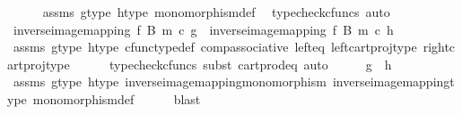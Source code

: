 \begin{isabellebody}
\ \ \ \ \isamarkupfalse%
\ assms\ g{\isacharunderscore}{\kern0pt}type\ h{\isacharunderscore}{\kern0pt}type\ monomorphism{\isacharunderscore}{\kern0pt}def{}\ \isamarkupfalse%
\ {\isacharparenleft}{\kern0pt}typecheck{\isacharunderscore}{\kern0pt}cfuncs{\isacharcomma}{\kern0pt}\ auto{\isacharparenright}{\kern0pt}\isanewline
\ \ \isamarkupfalse%
\ \isamarkupfalse%
\ {\isachardoublequoteopen}inverse{\isacharunderscore}{\kern0pt}image{\isacharunderscore}{\kern0pt}mapping\ f\ B\ m\ {\isasymcirc}\isactrlsub c\ g\ {\isacharequal}{\kern0pt}\ inverse{\isacharunderscore}{\kern0pt}image{\isacharunderscore}{\kern0pt}mapping\ f\ B\ m\ {\isasymcirc}\isactrlsub c\ h{\isachardoublequoteclose}\isanewline
\ \ \ \ \isamarkupfalse%
\ assms\ g{\isacharunderscore}{\kern0pt}type\ h{\isacharunderscore}{\kern0pt}type\ cfunc{\isacharunderscore}{\kern0pt}type{\isacharunderscore}{\kern0pt}def\ comp{\isacharunderscore}{\kern0pt}associative\ left{\isacharunderscore}{\kern0pt}eq\ left{\isacharunderscore}{\kern0pt}cart{\isacharunderscore}{\kern0pt}proj{\isacharunderscore}{\kern0pt}type\ right{\isacharunderscore}{\kern0pt}cart{\isacharunderscore}{\kern0pt}proj{\isacharunderscore}{\kern0pt}type\isanewline
\ \ \ \ \isamarkupfalse%
\ {\isacharparenleft}{\kern0pt}typecheck{\isacharunderscore}{\kern0pt}cfuncs{\isacharcomma}{\kern0pt}\ subst\ cart{\isacharunderscore}{\kern0pt}prod{\isacharunderscore}{\kern0pt}eq{\isacharcomma}{\kern0pt}\ auto{\isacharparenright}{\kern0pt}\isanewline
\ \ \isamarkupfalse%
\ \isamarkupfalse%
\ {\isachardoublequoteopen}g\ {\isacharequal}{\kern0pt}\ h{\isachardoublequoteclose}\isanewline
\ \ \ \ \isamarkupfalse%
\ assms\ g{\isacharunderscore}{\kern0pt}type\ h{\isacharunderscore}{\kern0pt}type\ inverse{\isacharunderscore}{\kern0pt}image{\isacharunderscore}{\kern0pt}mapping{\isacharunderscore}{\kern0pt}monomorphism\ inverse{\isacharunderscore}{\kern0pt}image{\isacharunderscore}{\kern0pt}mapping{\isacharunderscore}{\kern0pt}type\ monomorphism{\isacharunderscore}{\kern0pt}def{}\isanewline
\ \ \ \ \isamarkupfalse%
\ blast\isanewline
{}\isamarkupfalse%
%
\endisatagproof
{\isafoldproof}%
%
\isadelimproof
\isanewline
%
\endisadelimproof
\isanewline
{}\isamarkupfalse%

\end{isabellebody}
